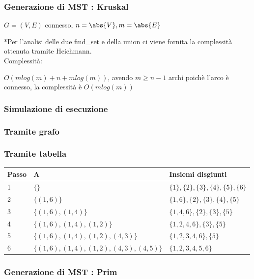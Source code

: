 \subsubsection{Generazione di MST : Kruskal}

$G=(V,E)$ connesso, $n=\abs{V},m=\abs{E}$



{*Per l'analisi delle due find\_set e della union ci viene fornita la complessità ottenuta tramite Heichmann.\\
}{Complessità}{:}

{$O(mlog(m)+n+mlog(m))$, avendo $m \geq n-1$ archi poichè l'arco è connesso, la complessità è $O(mlog(m))$}

\subsubsection{Simulazione di esecuzione}

\subsubsection{Tramite grafo}



\subsubsection{Tramite tabella}

\begin{tabular}{|l|l|l|}
\hline 
Passo & A & Insiemi disgiunti \\ 
\hline 
1 & $\{\}$ & $\{1\},\{2\},\{3\},\{4\},\{5\},\{6\}$ \\ 
\hline 
2 & $\{(1,6)\}$ & $\{1,6\},\{2\},\{3\},\{4\},\{5\}$ \\ 
\hline 
3 & $\{(1,6),(1,4)\}$ & $\{1,4,6\},\{2\},\{3\},\{5\}$ \\ 
\hline 
4 & $\{(1,6),(1,4),(1,2)\}$ & $\{1,2,4,6\},\{3\},\{5\}$ \\ 
\hline 
5 & $\{(1,6),(1,4),(1,2),(4,3)\}$ & $\{1,2,3,4,6\},\{5\}$ \\ 
\hline 
6 & $\{(1,6),(1,4),(1,2),(4,3),(4,5)\}$ & $\{1,2,3,4,5,6\}$ \\ 
\hline 
\end{tabular} 

\subsubsection{Generazione di MST : Prim}

